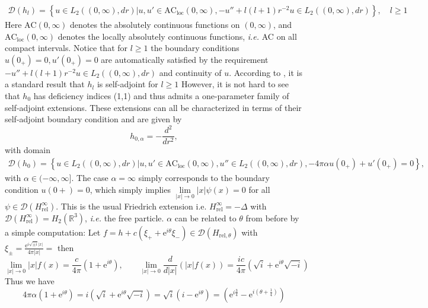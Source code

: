 \documentclass[a4paper,11pt]{article}
\newcommand{\euler}[1]{\text{e}^{#1}}
\newcommand{\dom}[1]{\mathscr D\left(#1\right)}
\newcommand{\ie}{\emph{i.e.} }
\newcommand{\R}{\mathbb{R}}
\begin{document}
\begin{equation}
\begin{aligned}
\dom{h_l}=\left\{u\in L_2((0,\infty),dr)|u,u'\in\text{AC}_{\text{loc}}(0,\infty),-u''+l(l+1)r^{-2}u\in L_2((0,\infty),dr)\right\},\quad l\geq 1
\end{aligned}
\end{equation}
Here $ \text{AC}(0,\infty) $ denotes the absolutely continuous functions on $ (0,\infty) $, and $ \text{AC}_{\text{loc}}(0,\infty) $ denotes the locally absolutely continuous functions, \ie AC on all compact intervals. Notice that for $ l\geq1 $ the boundary conditions $ u(0_+)=0, u'(0_+)=0 $ are automatically satisfied by the requirement $ -u''+l(l+1)r^{-2}u\in L_2((0,\infty),dr) $ and continuity of $ u $.
According to \cite{albeverio2012solvable}, it is a standard result that $ h_l $ is self-adjoint for $ l\geq1 $ However, it is not hard to see that $ h_0 $ has deficiency indices (1,1) and thus admits a one-parameter family of self-adjoint extensions. These extensions can all be characterized in terms of their self-adjoint boundary condition and are given by \begin{equation}
h_{0,\alpha}=-\frac{d^2}{dr^2},
\end{equation}
with domain \begin{equation}
\begin{aligned}
\dom{h_0}=\left\{u\in L_2((0,\infty),dr)|u,u'\in\text{AC}_{\text{loc}}(0,\infty),u''\in L_2((0,\infty),dr), -4\pi \alpha u(0_+)+u'(0_+)=0\right\},
\end{aligned}
\end{equation}
with $ \alpha\in (-\infty,\infty]$. The case $ \alpha=\infty $ simply corresponds to the boundary condition $ u(0+)=0 $, which simply implies $\lim\limits_{|x|\to 0}|x|\psi(x)=0$ for all $ \psi\in\dom{H_{\text{rel}}^\infty} $. This is the usual Friedrich extension i.e. $ H_{\text{rel}}^\infty=-\Delta $ with $ \dom{H_{\text{rel}}^\infty}=H_2(\R^3) $, \ie the free particle. 
$ \alpha $ can be related to $ \theta $ from before by a simple computation:
Let $ f=h+c(\xi_++\euler{i\theta}\xi_-)\in \dom{H_{\text{rel},\theta}} $ with $ \xi_\pm=\frac{\euler{i\sqrt{\pm i}|x|}}{4\pi |x|}= $ then
 \begin{equation}
 \lim\limits_{|x|\to0}|x|f(x)=\frac{c}{4\pi}(1+\euler{i\theta}),\qquad \lim\limits_{|x|\to0}\frac{d}{d|x|}(|x|f(x))=\frac{ic}{4\pi}(\sqrt{i}+\euler{i\theta}\sqrt{-i})
\end{equation}
Thus we have \begin{equation}
4\pi\alpha(1+\euler{i\theta})=i(\sqrt{i}+\euler{i\theta}\sqrt{-i})=\sqrt{i}(i-\euler{i\theta})=(\euler{i\frac{3}{4}}-\euler{i(\theta+\frac{1}{4})})
\end{equation}
\end{document}
